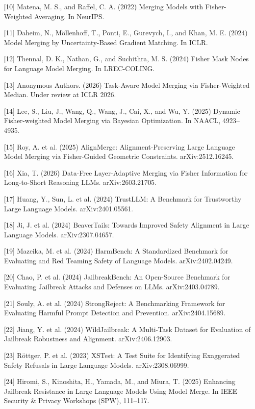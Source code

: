 \documentclass{article}
\begin{document}
{[10] Matena, M. S., and Raffel, C. A. (2022) Merging Models with Fisher-Weighted Averaging. In NeurIPS.

[11] Daheim, N., Möllenhoff, T., Ponti, E., Gurevych, I., and Khan, M. E. (2024) Model Merging by Uncertainty-Based Gradient Matching. In ICLR.

[12] Thennal, D. K., Nathan, G., and Suchithra, M. S. (2024) Fisher Mask Nodes for Language Model Merging. In LREC-COLING.

[13] Anonymous Authors. (2026) Task-Aware Model Merging via Fisher-Weighted Median. Under review at ICLR 2026.

[14] Lee, S., Liu, J., Wang, Q., Wang, J., Cai, X., and Wu, Y. (2025) Dynamic Fisher-weighted Model Merging via Bayesian Optimization. In NAACL, 4923–4935.

[15] Roy, A. et al. (2025) AlignMerge: Alignment-Preserving Large Language Model Merging via Fisher-Guided Geometric Constraints. arXiv:2512.16245.

[16] Xia, T. (2026) Data-Free Layer-Adaptive Merging via Fisher Information for Long-to-Short Reasoning LLMs. arXiv:2603.21705.

[17] Huang, Y., Sun, L. et al. (2024) TrustLLM: A Benchmark for Trustworthy Large Language Models. arXiv:2401.05561.

[18] Ji, J. et al. (2024) BeaverTails: Towards Improved Safety Alignment in Large Language Models. arXiv:2307.04657.

[19] Mazeika, M. et al. (2024) HarmBench: A Standardized Benchmark for Evaluating and Red Teaming Safety of Language Models. arXiv:2402.04249.

[20] Chao, P. et al. (2024) JailbreakBench: An Open-Source Benchmark for Evaluating Jailbreak Attacks and Defenses on LLMs. arXiv:2403.04789.

[21] Souly, A. et al. (2024) StrongReject: A Benchmarking Framework for Evaluating Harmful Prompt Detection and Prevention. arXiv:2404.15689.

[22] Jiang, Y. et al. (2024) WildJailbreak: A Multi-Task Dataset for Evaluation of Jailbreak Robustness and Alignment. arXiv:2406.12903.

[23] Röttger, P. et al. (2023) XSTest: A Test Suite for Identifying Exaggerated Safety Refusals in Large Language Models. arXiv:2308.06999.

[24] Hiromi, S., Kinoshita, H., Yamada, M., and Miura, T. (2025) Enhancing Jailbreak Resistance in Large Language Models Using Model Merge. In IEEE Security \& Privacy Workshops (SPW), 111–117.

}
\end{document}
